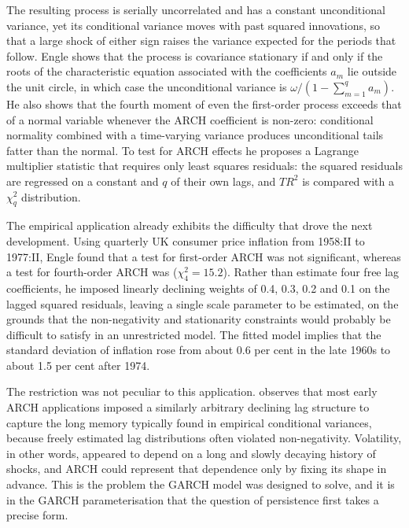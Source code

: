 The resulting process is serially uncorrelated and has a constant unconditional variance, yet its conditional variance moves with past squared innovations, so that a large shock of either sign raises the variance expected for the periods that follow. Engle shows that the process is covariance stationary if and only if the roots of the characteristic equation associated with the coefficients $a_m$ lie outside the unit circle, in which case the unconditional variance is $\omega / (1 - \sum_{m=1}^{q} a_m)$. He also shows that the fourth moment of even the first-order process exceeds that of a normal variable whenever the ARCH coefficient is non-zero: conditional normality combined with a time-varying variance produces unconditional tails fatter than the normal. To test for ARCH effects he proposes a Lagrange multiplier statistic that requires only least squares residuals: the squared residuals are regressed on a constant and $q$ of their own lags, and $TR^2$ is compared with a $\chi^2_q$ distribution.

The empirical application already exhibits the difficulty that drove the next development. Using quarterly UK consumer price inflation from 1958:II to 1977:II, Engle found that a test for first-order ARCH was not significant, whereas a test for fourth-order ARCH was ($\chi^2_4 = 15.2$). Rather than estimate four free lag coefficients, he imposed linearly declining weights of 0.4, 0.3, 0.2 and 0.1 on the lagged squared residuals, leaving a single scale parameter to be estimated, on the grounds that the non-negativity and stationarity constraints would probably be difficult to satisfy in an unrestricted model. The fitted model implies that the standard deviation of inflation rose from about 0.6 per cent in the late 1960s to about 1.5 per cent after 1974.

The restriction was not peculiar to this application. \textcite{bollerslev1986} observes that most early ARCH applications imposed a similarly arbitrary declining lag structure to capture the long memory typically found in empirical conditional variances, because freely estimated lag distributions often violated non-negativity. Volatility, in other words, appeared to depend on a long and slowly decaying history of shocks, and ARCH could represent that dependence only by fixing its shape in advance. This is the problem the GARCH model was designed to solve, and it is in the GARCH parameterisation that the question of persistence first takes a precise form.

